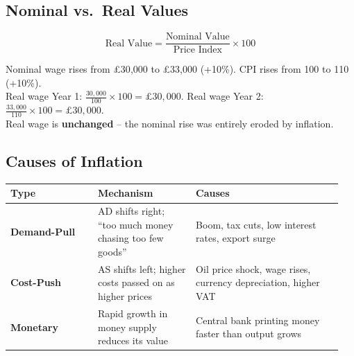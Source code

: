 \documentclass[11pt, a4paper, twoside]{book}
\begin{document}
\subsection{Nominal vs.\ Real Values}

\[
\text{Real Value} = \frac{\text{Nominal Value}}{\text{Price Index}} \times 100
\]

\begin{example}
Nominal wage rises from \pounds30{,}000 to \pounds33{,}000 (+10\%). CPI rises from 100 to 110 (+10\%).\\
Real wage Year 1: $\frac{30{,}000}{100} \times 100 = \pounds30{,}000$. \quad Real wage Year 2: $\frac{33{,}000}{110} \times 100 = \pounds30{,}000$.\\
Real wage is \textbf{unchanged} -- the nominal rise was entirely eroded by inflation.
\end{example}

\subsection{Causes of Inflation}

\begin{tcolorbox}[enhanced,colback=LightBlue,colframe=MidBlue!70,arc=0pt,boxrule=0.8pt]
\begin{tabular}{@{}>{\RaggedRight\arraybackslash}p{0.25\linewidth}>{\RaggedRight\arraybackslash}p{0.28\linewidth}>{\RaggedRight\arraybackslash}p{0.42\linewidth}@{}}
\textbf{\color{NavyPrimary}Type} & \textbf{\color{NavyPrimary}Mechanism} & \textbf{\color{NavyPrimary}Causes} \\
\midrule
\textbf{Demand-Pull} & AD shifts right; ``too much money chasing too few goods'' & Boom, tax cuts, low interest rates, export surge \\
\textbf{Cost-Push} & AS shifts left; higher costs passed on as higher prices & Oil price shock, wage rises, currency depreciation, higher VAT \\
\textbf{Monetary} & Rapid growth in money supply reduces its value & Central bank printing money faster than output grows \\
\end{tabular}
\end{tcolorbox}
\end{document}
